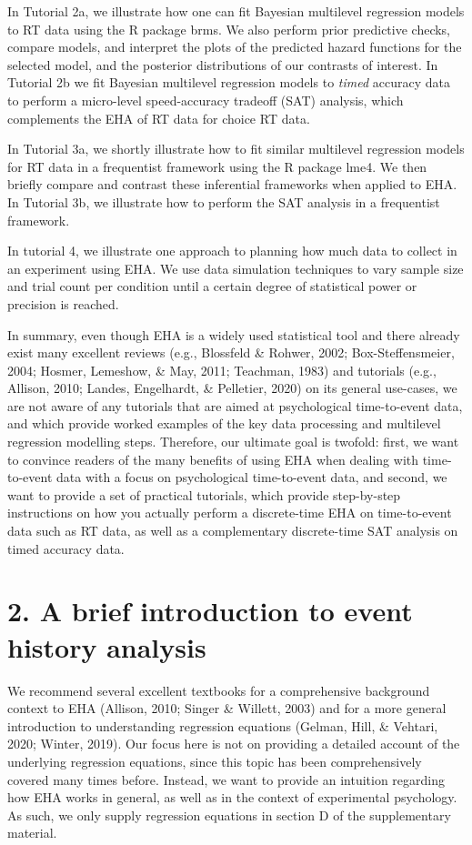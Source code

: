 \documentclass[
  man, donotrepeattitle,floatsintext]{apa6}
\begin{document}
In Tutorial 2a, we illustrate how one can fit Bayesian multilevel regression models to RT data using the R package brms. We also perform prior predictive checks, compare models, and interpret the plots of the predicted hazard functions for the selected model, and the posterior distributions of our contrasts of interest. In Tutorial 2b we fit Bayesian multilevel regression models to \emph{timed} accuracy data to perform a micro-level speed-accuracy tradeoff (SAT) analysis, which complements the EHA of RT data for choice RT data.

In Tutorial 3a, we shortly illustrate how to fit similar multilevel regression models for RT data in a frequentist framework using the R package lme4. We then briefly compare and contrast these inferential frameworks when applied to EHA. In Tutorial 3b, we illustrate how to perform the SAT analysis in a frequentist framework.

In tutorial 4, we illustrate one approach to planning how much data to collect in an experiment using EHA. We use data simulation techniques to vary sample size and trial count per condition until a certain degree of statistical power or precision is reached.

In summary, even though EHA is a widely used statistical tool and there already exist many excellent reviews (e.g., Blossfeld \& Rohwer, 2002; Box-Steffensmeier, 2004; Hosmer, Lemeshow, \& May, 2011; Teachman, 1983) and tutorials (e.g., Allison, 2010; Landes, Engelhardt, \& Pelletier, 2020) on its general use-cases, we are not aware of any tutorials that are aimed at psychological time-to-event data, and which provide worked examples of the key data processing and multilevel regression modelling steps.
Therefore, our ultimate goal is twofold: first, we want to convince readers of the many benefits of using EHA when dealing with time-to-event data with a focus on psychological time-to-event data, and second, we want to provide a set of practical tutorials, which provide step-by-step instructions on how you actually perform a discrete-time EHA on time-to-event data such as RT data, as well as a complementary discrete-time SAT analysis on timed accuracy data.

\section{2. A brief introduction to event history analysis}\label{a-brief-introduction-to-event-history-analysis}

We recommend several excellent textbooks for a comprehensive background context to EHA (Allison, 2010; Singer \& Willett, 2003) and for a more general introduction to understanding regression equations (Gelman, Hill, \& Vehtari, 2020; Winter, 2019). Our focus here is not on providing a detailed account of the underlying regression equations, since this topic has been comprehensively covered many times before. Instead, we want to provide an intuition regarding how EHA works in general, as well as in the context of experimental psychology. As such, we only supply regression equations in section D of the supplementary material.
\end{document}
